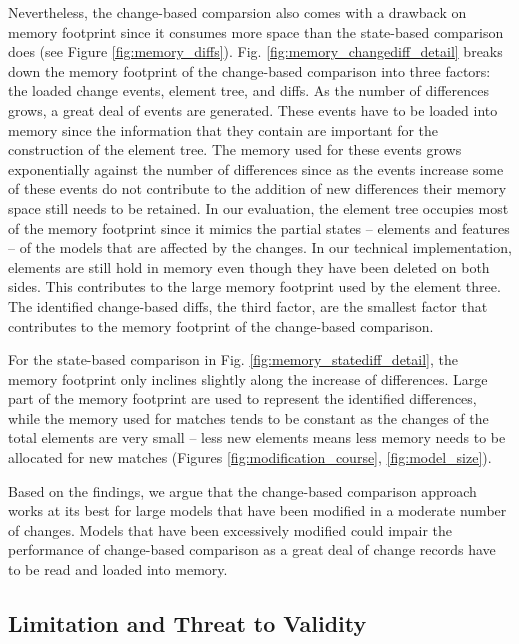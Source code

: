 \documentclass{llncs}
\begin{document}
Nevertheless, the change-based comparsion also comes with a drawback on memory footprint since it consumes more space than the state-based comparison does (see Figure \ref{fig:memory_diffs}). Fig. \ref{fig:memory_changediff_detail} breaks down the memory footprint of the change-based comparison into three factors: the loaded change events, element tree, and diffs. As the number of differences grows, a great deal of events are generated. These events have to be loaded into memory since the information that they contain are important for the construction of the element tree. The memory used for these events grows exponentially against the number of differences since as the events increase some of these events do not contribute to the addition of new differences their memory space still needs to be retained. In our evaluation, the element tree occupies most of the memory footprint since it mimics the partial states -- elements and features -- of the models that are affected by the changes. In our technical implementation, elements are still hold in memory even though they have been deleted on both sides. This contributes to the large memory footprint used by the element three. The identified change-based diffs, the third factor, are the smallest factor that contributes to the memory footprint of the change-based comparison. 

For the state-based comparison in Fig. \ref{fig:memory_statediff_detail}, the memory footprint only inclines slightly along the increase of differences. Large part of the memory footprint are used to represent the identified differences, while the memory used for matches tends to be constant as the changes of the total elements are very small -- less new elements means less memory needs to be allocated for new matches (Figures \ref{fig:modification_course}, \ref{fig:model_size}). 

Based on the findings, we argue that the change-based comparison approach works at its best for large models that have been modified in a moderate number of changes. Models that have been excessively modified could impair the performance of change-based comparison as a great deal of change records have to be read and loaded into memory. 

\subsection{Limitation and Threat to Validity}
\label{sec:limitation_and_Threat_to_validity}
\end{document}
